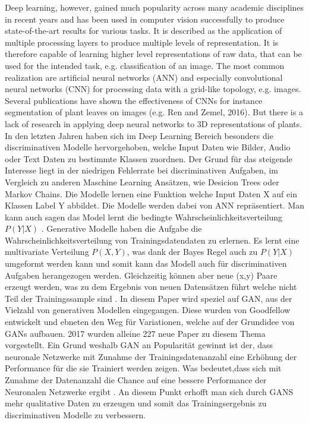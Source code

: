 \documentclass{llncs}
\begin{document}
Deep learning, however, gained much popularity across many academic disciplines
in recent years and has been used in computer vision successfully to
produce state-of-the-art results for various tasks. It is described as the application
of multiple processing layers to produce multiple levels of representation. It
is therefore capable of learning higher level representations of raw data, that can
be used for the intended task, e.g. classification of an image. The most common
realization are artificial neural networks (ANN) and especially convolutional
neural networks (CNN) for processing data with a grid-like topology, e.g. images.
Several publications have shown the effectiveness of CNNs for instance
segmentation of plant leaves on images (e.g. Ren and Zemel, 2016). But there
is a lack of research in applying deep neural networks to 3D representations of
plants.
\\

In den letzten Jahren haben sich im Deep Learning Bereich besonders die discriminativen Modelle hervorgehoben, welche Input Daten wie Bilder, Audio oder Text Daten zu bestimmte Klassen zuordnen. Der Grund für das steigende Interesse liegt in der niedrigen Fehlerrate bei discriminativen Aufgaben, im Vergleich zu anderen Maschine Learning Ansätzen, wie Desicion Trees oder Markov Chains\cite{Grundlagen}. Die Modelle lernen eine Funktion welche Input Daten X auf ein Klassen Label Y abbildet. Die Modelle werden dabei von ANN repräsentiert. Man kann auch sagen das Model lernt die bedingte Wahrscheinlichkeitsverteilung $P(Y|X)$ \cite{discrim}. Generative Modelle haben die Aufgabe die Wahrscheinlichkeitsverteilung von Trainingsdatendaten zu erlernen. Es lernt eine multivariate Verteilung $P(X,Y)$, was dank der Bayes Regel auch zu $P(Y|X)$ umgeformt werden kann und somit kann das Modell auch für discriminativen Aufgaben herangezogen werden. Gleichzeitig können aber neue (x,y) Paare erzeugt werden, was zu dem Ergebnis von neuen Datensätzen führt welche nicht Teil der Trainingssample sind \cite{discrim}. In diesem Paper wird speziel auf GAN, aus der Vielzahl von generativen Modellen eingegangen. Diese wurden von Goodfellow\cite{goodfellow2014} entwickelt und ebneten den Weg für Variationen, welche auf der Grundidee von GANs aufbauen. 2017 wurden alleine 227 neue Paper zu diesem Thema vorgestellt. Ein Grund weshalb GAN an Popularität gewinnt ist der, dass neuronale Netzwerke mit Zunahme der Trainingsdatenanzahl eine Erhöhung der Performance für die sie Trainiert werden zeigen. Was bedeutet,dass sich mit Zunahme der Datenanzahl die Chance auf eine bessere Performance der Neuronalen Netzwerke ergibt \cite{data}. An diesem Punkt erhofft man sich durch GANS mehr qualitative Daten zu erzeugen und somit das Trainingsergebnis zu discriminativen Modelle zu verbessern. 
\end{document}
